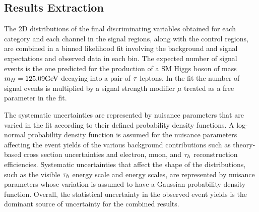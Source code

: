 %


\subsection{Results Extraction}
\label{sec:htt_fit_details}
The 2D distributions of the final discriminating variables obtained for each category and each channel in the 
signal regions, along with the control regions, are combined in a binned likelihood fit involving the 
background and signal expectations and observed data in each bin.
The expected number of signal events is the one predicted for the production of
a SM Higgs boson of mass $m_{H}=125.09\mathrm{GeV}$ decaying into a pair of $\tau$ leptons. In the fit
the number of signal events is
multiplied by a signal strength modifier $\mu$ treated as a free parameter in the fit.

The systematic uncertainties are represented by nuisance parameters that are varied in the fit 
according to their defined probability density functions.
A log-normal probability density function is assumed for the nuisance parameters affecting the event yields 
of the various background contributions such as theory-based cross section uncertainties and
electron, muon, and $\tau_{h}$ reconstruction efficiencies. Systematic uncertainties that affect the shape of the 
distributions, such as the visible $\tau_{h}$ energy scale and \etvecmiss energy scales, are represented 
by nuisance parameters whose variation 
is assumed to have a Gaussian probability density function.
Overall, the statistical uncertainty in the observed event yields is the dominant source of uncertainty 
for the combined results.


